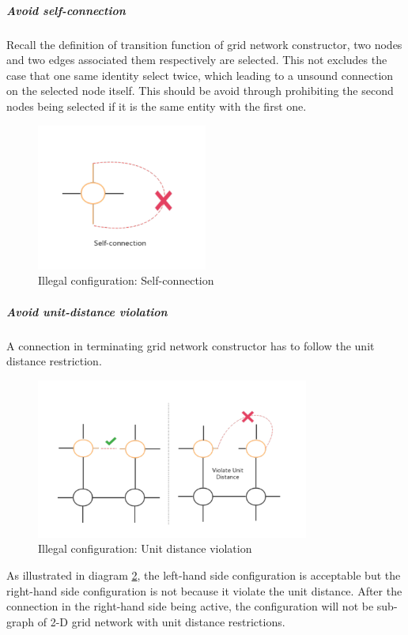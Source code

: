 \subparagraph{Avoid self-connection}\noindent
Recall the definition of transition function of grid network constructor, two nodes and two edges associated them respectively are selected.
This not excludes the case that one same identity select twice, which leading to a
unsound connection on the selected node itself. This should be avoid through prohibiting the second nodes being selected if it is the
same entity with the first one.
\begin{figure}[H]
\begin{center}
\includegraphics[width = 0.5\textwidth]{context/diagram/self-connection.pdf}
\caption{Illegal configuration: Self-connection}
\label{selfcon}
\end{center}
\end{figure}

\par\noindent
\subparagraph{Avoid unit-distance violation}\noindent
A connection in terminating grid network constructor has to follow the unit distance restriction.
\begin{figure}[H]
\begin{center}
\includegraphics[width = 0.8\textwidth]{context/diagram/unitDistanceViolation.pdf}
\caption{Illegal configuration: Unit distance violation}
\label{unitvio}
\end{center}
\end{figure}
\par\noindent
As illustrated in diagram \ref{unitvio}, the left-hand side configuration is acceptable but the right-hand side configuration is not because
it violate the unit distance. After the connection in the right-hand side being active, the configuration will not be sub-graph of 2-D grid network
with unit distance restrictions.

